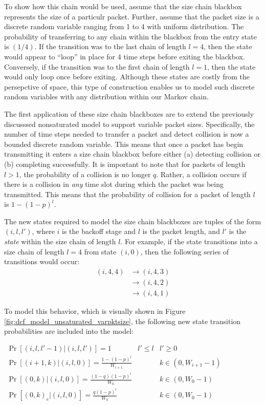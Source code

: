\documentclass{llncs}
\begin{document}
To show how this chain would be used, assume that the size chain blackbox represents the size of a particulr packet. Further, assume that the packet size is a discrete random variable ranging from 1 to 4 with uniform distribution. The probability of transferring to any chain within the blackbox from the entry state is $(1/4)$. If the transition was to the last chain of length $l = 4$, then the state would appear to ``loop'' in place for 4 time steps before exiting the blackbox. Conversely, if the transition was to the first chain of length $l = 1$, then the state would only loop once before exiting. Although these states are costly from the persepctive of space, this type of construction enables us to model such discrete random variables with any distribution within our Markov chain. 

The first application of these size chain blackboxes are to extend the previously discusssed nonsaturated model to support variable packet sizes. Specifically, the number of time steps needed to transfer a packet and detect collision is now a bounded discrete random variable. This means that once a packet has begin transmitting it enters a size chain blackbox before either (a) detecting collision or (b) completing successfully. It is important to note that for packets of length $l > 1$, the probability of a collision is no longer $q$. Rather, a collision occurs if there is a collision in \emph{any} time slot during which the packet was being transmitted. This means that the probability of collision for a packet of length $l$ is $1 - (1 - p)^l$. 

The new states required to model the size chain blackboxes are tuples of the form $(i, l, l')$, where $i$ is the backoff stage and $l$ is the packet length, and $l'$ is the \emph{state} within the size chain of length $l$. For example, if the state transitions into a size chain of length $l = 4$ from state $(i, 0)$, then the following series of transitions would occur: 
\begin{align*}
(i, 4, 4) & \to (i, 4, 3) \\
& \to (i, 4, 2) \\
& \to (i, 4, 1)
\end{align*}

To model this behavior, which is visually shown in Figure \ref{fig:dcf_model_unsaturated_varpktsize}, the following new state transition probabilities are included into the model:

\begin{center}
\begin{math}
\boxed{
\begin{array}{lll}
\Pr[(i,l,l'-1) | (i,l,l')] = 1 & l' \leq l & l' \geq 0 \\
\Pr[(i+1,k) | (i,l,0)] = \frac{1 - (1 - p)^l}{W_{i+1}} & ~ & k \in (0, W_{i+1} - 1) \\
\Pr[(0,k) | (i,l,0)] = \frac{(1 - q)(1 - p)^l}{W_0} & ~ & k \in (0, W_{0} - 1) \\
\Pr[(0,k)_e | (i,l,0)] = \frac{q(1 - p)^l}{W_0} & ~ & k \in (0, W_{0} - 1) \\
\end{array}
}
\end{math}
\end{center}
\end{document}

